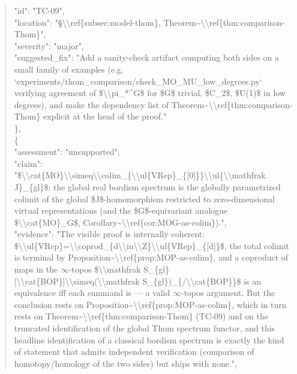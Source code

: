 \documentclass[11pt]{article}
\begin{document}
\begin{quote}
      "id": "TC-09",\\
      "location": "§\textbackslash{}\textbackslash{}ref\{subsec:model-thom\}, Theorem\~{}\textbackslash{}\textbackslash{}ref\{thm:comparison-Thom\}",\\
      "severity": "major",\\
      "suggested\_fix": "Add a sanity-check artifact computing both sides on a small family of examples (e.g. `experiments/thom\_comparison/check\_MO\_MU\_low\_degrees.py` verifying agreement of \$\textbackslash{}\textbackslash{}pi\_*\^{}G\$ for \$G\$ trivial, \$C\_2\$, \$U(1)\$ in low degrees), and make the dependency list of Theorem\~{}\textbackslash{}\textbackslash{}ref\{thm:comparison-Thom\} explicit at the head of the proof."\\
    \},\\
    \{\\
      "assessment": "unsupported",\\
      "claim": "\$\textbackslash{}\textbackslash{}cat\{MO\}\textbackslash{}\textbackslash{}simeq\textbackslash{}\textbackslash{}colim\_\{\textbackslash{}\textbackslash{}ul\{VRep\}\_\{[0]\}\}\textbackslash{}\textbackslash{}ul\{\textbackslash{}\textbackslash{}mathfrak J\}\_\{gl\}\$: the global real bordism spectrum is the globally parametrized colimit of the global \$J\$-homomorphism restricted to zero-dimensional virtual representations (and the \$G\$-equivariant analogue \$\textbackslash{}\textbackslash{}cat\{MO\}\_G\$, Corollary\~{}\textbackslash{}\textbackslash{}ref\{cor:MOG-as-colim\}).",\\
      "evidence": "The visible proof is internally coherent: \$\textbackslash{}\textbackslash{}ul\{VRep\}=\textbackslash{}\textbackslash{}coprod\_\{d\textbackslash{}\textbackslash{}in\textbackslash{}\textbackslash{}Z\}\textbackslash{}\textbackslash{}ul\{VRep\}\_\{[d]\}\$, the total colimit is terminal by Proposition\~{}\textbackslash{}\textbackslash{}ref\{prop:MOP-as-colim\}, and a coproduct of maps in the \ensuremath{\infty}-topos \$\textbackslash{}\textbackslash{}mathfrak S\_\{gl\}[\textbackslash{}\textbackslash{}cat\{BOP\}]\textbackslash{}\textbackslash{}simeq(\textbackslash{}\textbackslash{}mathfrak S\_\{gl\})\_\{/\textbackslash{}\textbackslash{}cat\{BOP\}\}\$ is an equivalence iff each summand is --- a valid \ensuremath{\infty}-topos argument. But the conclusion rests on Proposition\~{}\textbackslash{}\textbackslash{}ref\{prop:MOP-as-colim\}, which in turn rests on Theorem\~{}\textbackslash{}\textbackslash{}ref\{thm:comparison-Thom\} (TC-09) and on the truncated identification of the global Thom spectrum functor, and this headline identification of a classical bordism spectrum is exactly the kind of statement that admits independent verification (comparison of homotopy/homology of the two sides) but ships with none.",\\

\end{quote}
\end{document}
